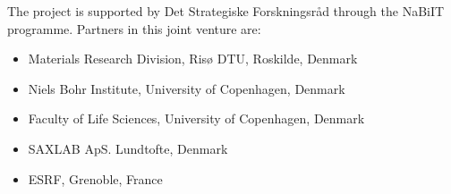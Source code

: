 The \MCX project is supported by Det Strategiske Forskningsråd through the NaBiIT programme. Partners in this joint venture are: 
\begin{itemize}
\item Materials Research Division, Risø DTU, Roskilde, Denmark\\
\item Niels Bohr Institute, University of Copenhagen, Denmark\\
\item Faculty of Life Sciences, University of Copenhagen, Denmark\\
\item SAXLAB ApS. Lundtofte, Denmark\\
\item ESRF, Grenoble, France
\end{itemize}
